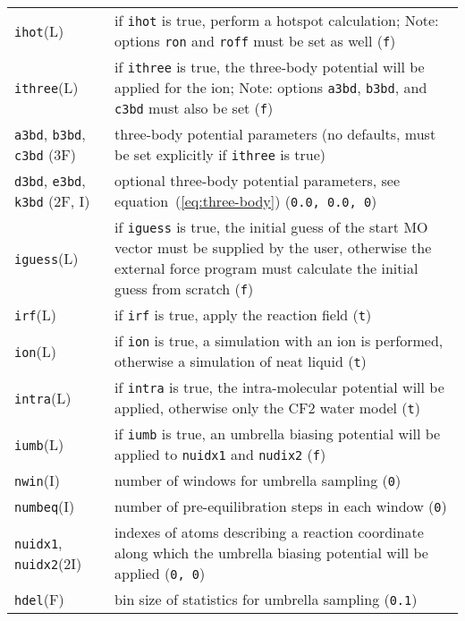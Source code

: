 \documentclass[12pt,a4paper]{article}
\newcommand{\Option}[1]{\texttt{#1}}
\newcommand{\OptionValue}[1]{\texttt{#1}}
\begin{document}
\begin{tabularx}{\columnwidth}{p{}X}
  \Option{ihot}(L) & if \Option{ihot} is true, perform a hotspot calculation;
  Note: options \Option{ron} and \Option{roff} must be set as well
  (\OptionValue{f}) \\
  \Option{ithree}(L) & if \Option{ithree} is true, the three-body potential
  will be applied for the ion; Note: options \Option{a3bd}, \Option{b3bd}, and
  \Option{c3bd} must also be set (\OptionValue{f}) \\
  \Option{a3bd}, \Option{b3bd}, \Option{c3bd} (3F) & three-body potential
  parameters (no defaults, must be set explicitly if \Option{ithree} is true)
  \\
  \Option{d3bd}, \Option{e3bd}, \Option{k3bd} (2F, I) & optional three-body
  potential parameters, see equation~(\ref{eq:three-body}) (\OptionValue{0.0,
    0.0, 0}) \\
  \Option{iguess}(L) & if \Option{iguess} is true, the initial guess of the
  start MO vector must be supplied by the user, otherwise the external force
  program must calculate the initial guess from scratch (\OptionValue{f}) \\
  \Option{irf}(L) & if \Option{irf} is true, apply the reaction
  field\cite{vanGunsteren:FaradayDiscussChemSoc-66-58,Adams:MolPhys-38-2-387}
  (\OptionValue{t}) \\
  \Option{ion}(L) & if \Option{ion} is true, a simulation with an ion is
  performed, otherwise a simulation of neat liquid (\OptionValue{t}) \\
  \Option{intra}(L) & if \Option{intra} is true, the intra-molecular
  potential\cite{Bopp:ChemPhysLett-98-2-129} will be applied, otherwise only
  the CF2 water
  model\cite{Stillinger:JChemPhys-68-2-666,Jansco:ChemPhys-85-377}
  (\OptionValue{t}) \\
  \Option{iumb}(L) & if \Option{iumb} is true, an umbrella biasing potential
  will be applied to \Option{nuidx1} and \Option{nudix2} (\OptionValue{f}) \\
  \Option{nwin}(I) & number of windows for umbrella sampling (\OptionValue{0})
  \\
  \Option{numbeq}(I) & number of pre-equilibration steps in each window
  (\OptionValue{0}) \\
  \Option{nuidx1}, \Option{nuidx2}(2I) & indexes of atoms describing a reaction
  coordinate along which the umbrella biasing potential will be applied
  (\OptionValue{0, 0}) \\
  \Option{hdel}(F) & bin size of statistics for umbrella sampling
  (\OptionValue{0.1})
\end{tabularx}
\end{document}
